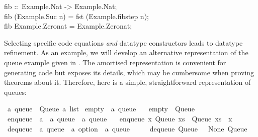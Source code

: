 \begin{isabellebody}
\begin{isamarkuptext}
\hspace*{0pt}fib ::~Example.Nat -> Example.Nat;\\
\hspace*{0pt}fib (Example.Suc n) = fst (Example.fib{}step n);\\
\hspace*{0pt}fib Example.Zero{}nat = Example.Zero{}nat;%
\end{isamarkuptext}%
\isamarkuptrue%
%
\endisatagquote
{\isafoldquote}%
%
\isadelimquote
%
\endisadelimquote
%
\isamarkuptrue%
%
\begin{isamarkuptext}%
Selecting specific code equations \emph{and} datatype constructors
  leads to datatype refinement.  As an example, we will develop an
  alternative representation of the queue example given in
  .  The amortised representation is
  convenient for generating code but exposes its 
  details, which may be cumbersome when proving theorems about it.
  Therefore, here is a simple, straightforward representation of
  queues:%
\end{isamarkuptext}%
\isamarkuptrue%
%
\isadelimquote
%
\endisadelimquote
%
\isatagquote
{}\isamarkupfalse%
\ {\isacharprime}a\ queue\ {\isacharequal}\ Queue\ {\isachardoublequoteopen}{\isacharprime}a\ list{\isachardoublequoteclose}\isanewline
\isanewline
{}\isamarkupfalse%
\ empty\ {\isacharcolon}{\isacharcolon}\ {\isachardoublequoteopen}{\isacharprime}a\ queue{\isachardoublequoteclose}\ \isanewline
\ \ {\isachardoublequoteopen}empty\ {\isacharequal}\ Queue\ {\isacharbrackleft}{\isacharbrackright}{\isachardoublequoteclose}\isanewline
\isanewline
{}\isamarkupfalse%
\ enqueue\ {\isacharcolon}{\isacharcolon}\ {\isachardoublequoteopen}{\isacharprime}a\ {\isasymRightarrow}\ {\isacharprime}a\ queue\ {\isasymRightarrow}\ {\isacharprime}a\ queue{\isachardoublequoteclose}\ \isanewline
\ \ {\isachardoublequoteopen}enqueue\ x\ {\isacharparenleft}Queue\ xs{\isacharparenright}\ {\isacharequal}\ Queue\ {\isacharparenleft}xs\ {\isacharat}\ {\isacharbrackleft}x{\isacharbrackright}{\isacharparenright}{\isachardoublequoteclose}\isanewline
\isanewline
{}\isamarkupfalse%
\ dequeue\ {\isacharcolon}{\isacharcolon}\ {\isachardoublequoteopen}{\isacharprime}a\ queue\ {\isasymRightarrow}\ {\isacharprime}a\ option\ {\isasymtimes}\ {\isacharprime}a\ queue{\isachardoublequoteclose}\ \isanewline
\ \ \ \ {\isachardoublequoteopen}dequeue\ {\isacharparenleft}Queue\ {\isacharbrackleft}{\isacharbrackright}{\isacharparenright}\ {\isacharequal}\ {\isacharparenleft}None{\isacharcomma}\ Queue\ {\isacharbrackleft}{\isacharbrackright}{\isacharparenright}{\isachardoublequoteclose}\isanewline

\end{isabellebody}
